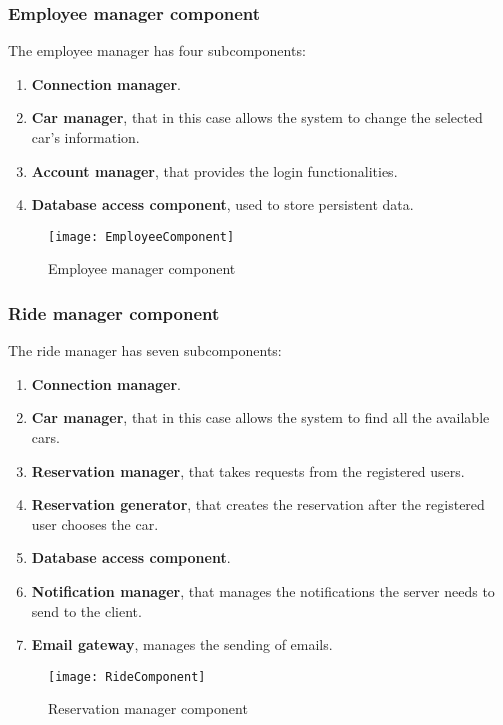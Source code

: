 \subsubsection{Employee manager component}
The employee manager has four subcomponents:
\begin{enumerate}
	\item \textbf{Connection manager}.
	\item \textbf{Car manager}, that in this case allows the system to change the selected car's information.
	\item \textbf{Account manager}, that provides the login functionalities.
	\item \textbf{Database access component}, used to store persistent data.
\end{enumerate}
\begin{figure}[H]
	\centering
	\texttt{[image: EmployeeComponent]}
	\caption{Employee manager component}
\end{figure}
\newpage
\subsubsection{Ride manager component}
The ride manager has seven subcomponents:
\begin{enumerate}
	\item \textbf{Connection manager}.
	\item \textbf{Car manager}, that in this case allows the system to find all the available cars.
	\item \textbf{Reservation manager}, that takes requests from the registered users.
	\item \textbf{Reservation generator}, that creates the reservation after the registered user chooses the car.
	\item \textbf{Database access component}.
	\item \textbf{Notification manager}, that manages the notifications the server needs to send to the client.
	\item \textbf{Email gateway}, manages the sending of emails.
\end{enumerate}
\begin{figure}[H]
	\centering
	\texttt{[image: RideComponent]}
	\caption{Reservation manager component}
\end{figure}
\newpage
